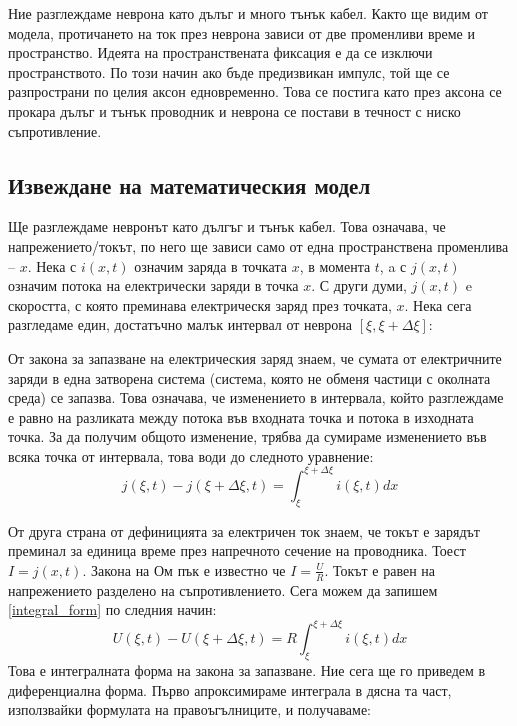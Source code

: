 \documentclass{article}
\begin{document}
        Ние разглеждаме неврона като дълъг и много тънък кабел. Както ще видим от модела, протичането на ток през неврона
        зависи от две променливи време и пространство. Идеята на пространствената фиксация е да се изключи пространството.
        По този начин ако бъде предизвикан импулс, той ще се разпространи по целия аксон едновременно. Това се постига като
        през аксона се прокара дълъг и тънък проводник и неврона се постави в течност с ниско съпротивление.
    \subsection{Извеждане на математическия модел}
    Ще разглеждаме невронът като дългъг и тънък кабел. Това означава, че напрежението/токът, по него ще зависи само от една пространствена
    променлива -- $x$. Нека с $i\left(x, t\right)$ означим заряда в точката $x$, в момента $t$, a с $j\left(x, t\right)$ означим потока на електрически заряди в точка $x$. С други думи, $j\left(x, t\right)$ e
    скоростта, с която преминава електрическя заряд през точката, $x$. Нека сега разгледаме един, достатъчно малък интервал от неврона
    $\left[\xi, \xi+\Delta\xi\right]$:

    \begin{figure}[h!]
        \centering
        
        \caption{}
    \end{figure}

    От закона за запазване на електрическия заряд знаем, че сумата от електричните заряди в една затворена система (система, която не обменя
    частици с околната среда) се запазва. Това означава, че изменението в интервала, който разглеждаме е равно на разликата между потока във
    входната точка и потока в изходната точка. За да получим общото изменение, трябва да сумираме изменението във всяка точка от интервала,
    това води до следното уравнение:
    \begin{equation}\label{integral_form}
        j\left(\xi,t\right) - j\left(\xi + \Delta\xi, t\right) = \int_{\xi}^{\xi + \Delta\xi} i\left(\xi,t\right)dx
    \end{equation}

    От друга страна от дефиницията за електричен ток знаем, че токът е зарядът преминал за единица време през напречното сечение на
    проводника. Тоест $I = j\left(x, t\right)$. Закона на Ом пък е известно че $I = \frac{U}{R} $. Токът е равен на напрежението разделено
    на съпротивлението. Сега можем да запишем \eqref{integral_form} по следния начин:
    \begin{equation}
        U\left(\xi,t\right) - U\left(\xi + \Delta\xi, t\right) = R\int_{\xi}^{\xi + \Delta\xi} i\left(\xi,t\right)dx
    \end{equation}
    Това е интегралната форма на закона за запазване. Ние сега ще го приведем в диференциална форма. Първо апроксимираме интеграла в дясна
    та част, използвайки формулата на правоъгълниците, и получаваме:
    
\end{document}

